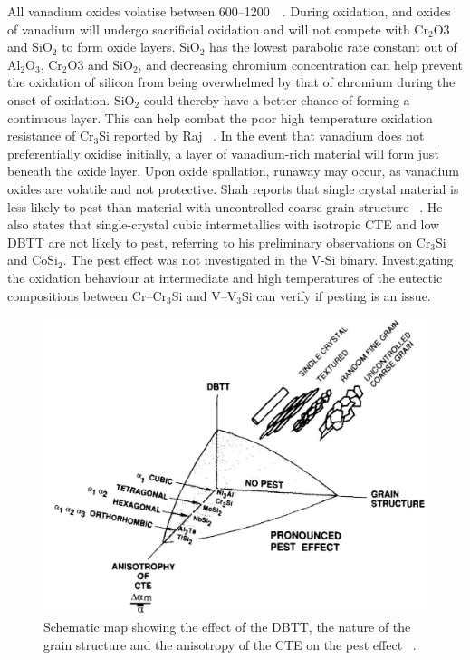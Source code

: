 All vanadium oxides volatise between 600--1200\celsius\ ~\cite{wriedt90}. During oxidation, and oxides of vanadium will undergo sacrificial oxidation and will not compete with Cr$_2$O3 and SiO$_2$ to form oxide layers. SiO$_2$ has the lowest parabolic rate constant out of Al$_2$O$_3$, Cr$_2$O3 and SiO$_2$, and decreasing chromium concentration can help prevent the oxidation of silicon from being overwhelmed by that of chromium during the onset of oxidation. SiO$_2$ could thereby have a better chance of forming a continuous layer. This can help combat the poor high temperature oxidation resistance of Cr$_3$Si reported by Raj ~\cite{raj95}. In the event that vanadium does not preferentially oxidise initially, a layer of vanadium-rich material will form just beneath the oxide layer. Upon oxide spallation, runaway may occur, as vanadium oxides are volatile and not protective. Shah reports that single crystal material is less likely to pest than material with uncontrolled coarse grain structure ~\cite{shah92}. He also states that single-crystal cubic intermetallics with isotropic CTE and low DBTT are not likely to pest, referring to his preliminary observations on Cr$_3$Si and CoSi$_2$. The pest effect was not investigated in the V-Si binary. Investigating the oxidation behaviour at intermediate and high temperatures of the eutectic compositions between Cr--Cr$_3$Si and V--V$_3$Si can verify if pesting is an issue.
%
\begin{figure}[H]
\begin{center}
\includegraphics{shahpest}
\caption{Schematic map showing the effect of the DBTT, the nature of the grain structure and the anisotropy of the CTE on the pest effect ~\cite{shah92}.}
\label{fig:shahpest}
\end{center}
\end{figure}
